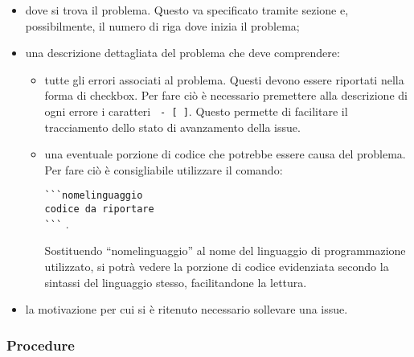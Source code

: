 \documentclass[../NormeProgetto.tex]{subfiles}
\begin{document}
		\begin{itemize} 
			\item dove si trova il problema. Questo va specificato tramite sezione e, possibilmente, il numero di riga dove inizia il problema;
			\item una descrizione dettagliata del problema che deve comprendere:
			\begin{itemize}
				\item tutte gli errori associati al problema. Questi devono essere riportati nella forma di checkbox. Per fare ciò è necessario premettere alla descrizione di ogni errore i caratteri \texttt{ - [ ]}. Questo permette di facilitare il tracciamento dello stato di avanzamento della issue.
				\item una eventuale porzione di codice che potrebbe essere causa del problema. Per fare ciò è consigliabile utilizzare il comando: \begin{center} \texttt {\`{}\`{}\`{}nomelinguaggio\\ codice da riportare\\ \`{}\`{}\`{}} .\end{center} Sostituendo ``nomelinguaggio'' al nome del linguaggio di programmazione utilizzato, si potrà vedere la porzione di codice evidenziata secondo la sintassi del linguaggio stesso, facilitandone la lettura.
			\end{itemize}
			\item la motivazione per cui si è ritenuto necessario sollevare una issue.
		\end{itemize}
			
	\subsubsection{Procedure}	
\end{document}
